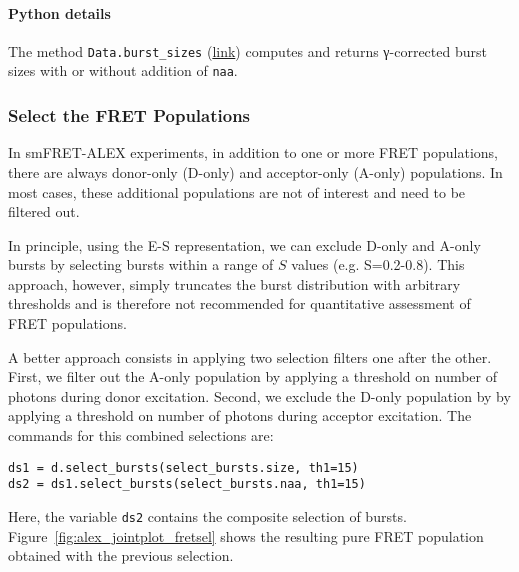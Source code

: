 \paragraph{Python details} The method \verb|Data.burst_sizes|
(\href{http://fretbursts.readthedocs.org/en/latest/data_class.html#fretbursts.burstlib.Data.burst_sizes}{link})
computes and returns γ-corrected burst sizes with or without addition of \verb|naa|.

\subsubsection{Select the FRET Populations}

In smFRET-ALEX experiments, in addition to one or more FRET populations, there are always
donor-only (D-only) and acceptor-only (A-only) populations.
In most cases, these additional populations are not of interest and need to be filtered out.

In principle, using the E-S representation, we can exclude D-only and A-only bursts
by selecting bursts within a range of $S$ values (e.g. S=0.2-0.8). 
This approach, however, simply truncates the burst distribution with arbitrary
thresholds and is therefore not recommended for quantitative assessment of FRET
populations.

A better approach consists in applying two selection filters one after the other.
First, we filter out the A-only population
by applying a threshold on number of photons during donor excitation.
Second, we exclude the D-only population by
by applying a threshold on number of photons during acceptor excitation.
The commands for this combined selections are:

\begin{lstlisting}
ds1 = d.select_bursts(select_bursts.size, th1=15)
ds2 = ds1.select_bursts(select_bursts.naa, th1=15)
\end{lstlisting}

Here, the variable \verb|ds2| contains the composite selection of bursts.
Figure~\ref{fig:alex_jointplot_fretsel} shows the resulting pure FRET
population obtained with the previous selection.

